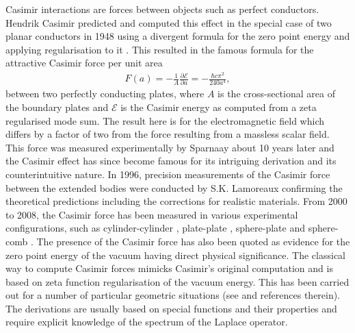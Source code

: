 Casimir interactions are forces between objects such as perfect conductors. Hendrik Casimir predicted and computed this effect in the special case of two planar 
conductors in 1948 using a divergent formula for the zero point energy and applying regularisation to it \cite{casimir1948attraction}. This resulted in the 
famous formula for the attractive Casimir force per unit area 
\begin{align*}
    F(a) = -\frac{1}{A}\frac{\partial \mathcal{E}}{\partial a} = -\frac{\hbar c\pi^{2}}{240a^{4}},
\end{align*}
between two perfectly conducting plates, where $A$ is the cross-sectional area of the boundary plates and $\mathcal{E}$ is the Casimir energy as 
computed from a zeta regularised mode sum. The result here is for the electromagnetic field which differs by a factor of two from the force resulting from a 
massless scalar field.
This force was measured experimentally by Sparnaay 
about 10 years later \cite{sparnaay1958measurements} and the Casimir effect has since become famous for its intriguing derivation and its counterintuitive nature.
In 1996, precision measurements of the Casimir force between 
the extended bodies were conducted by S.K. Lamoreaux \cite{lamoreaux1997demonstration}  confirming the theoretical predictions including the corrections for 
realistic materials. From 2000 to 2008, the Casimir force has been measured in various 
experimental configurations, such as cylinder-cylinder \cite{ederth2000template}, plate-plate \cite{bressi2002measurement}, 
sphere-plate \cite{krause2007experimental} and sphere-comb \cite{chan2008measurement}. 
The presence of the Casimir force has also been quoted as evidence for the zero point energy of the vacuum having direct physical significance.
The classical way to compute Casimir forces mimicks Casimir's original computation and is based on zeta function regularisation of the vacuum energy. 
This has been carried out for a number of particular geometric situations (see \cite{bordag2001new, bordag2009advances, elizalde1989expressions, elizalde1990heat, kirsten2001spectral} and references therein). 
The derivations are usually based on special functions and their properties and require explicit knowledge of the spectrum of the Laplace operator.

